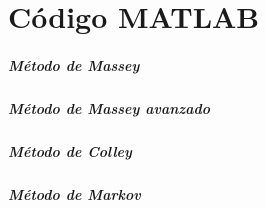 \chapter{Código MATLAB}

\paragraph{Método de Massey}

%

\paragraph{Método de Massey avanzado}

\paragraph{Método de Colley}

\paragraph{Método de Markov}
